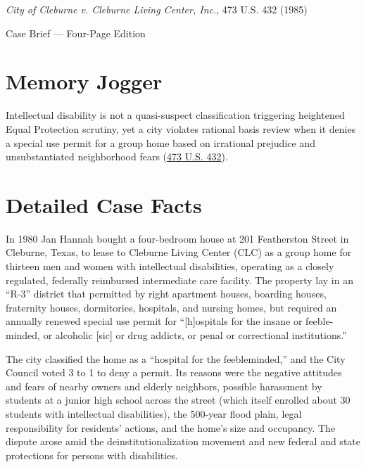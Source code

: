 \documentclass[12pt]{article}
\begin{document}
\begin{center}
{\LARGE \textit{City of Cleburne v. Cleburne Living Center, Inc.}, 473 U.S. 432 (1985)\par}
\vspace{0.8em}
{\large Case Brief --- Four-Page Edition\par}
\end{center}
\vspace{1em}

\section{Memory Jogger}

Intellectual disability is not a quasi-suspect classification triggering heightened Equal Protection scrutiny, yet a city violates rational basis review when it denies a special use permit for a group home based on irrational prejudice and unsubstantiated neighborhood fears (\href{https://supreme.justia.com/cases/federal/us/473/432/}{473 U.S. 432}).

\section{Detailed Case Facts}

In 1980 Jan Hannah bought a four-bedroom house at 201 Featherston Street in Cleburne, Texas, to lease to Cleburne Living Center (CLC) as a group home for thirteen men and women with intellectual disabilities, operating as a closely regulated, federally reimbursed intermediate care facility. The property lay in an ``R-3'' district that permitted by right apartment houses, boarding houses, fraternity houses, dormitories, hospitals, and nursing homes, but required an annually renewed special use permit for ``[h]ospitals for the insane or feeble-minded, or alcoholic [sic] or drug addicts, or penal or correctional institutions.''

The city classified the home as a ``hospital for the feebleminded,'' and the City Council voted 3 to 1 to deny a permit. Its reasons were the negative attitudes and fears of nearby owners and elderly neighbors, possible harassment by students at a junior high school across the street (which itself enrolled about 30 students with intellectual disabilities), the 500-year flood plain, legal responsibility for residents' actions, and the home's size and occupancy. The dispute arose amid the deinstitutionalization movement and new federal and state protections for persons with disabilities.
\end{document}
